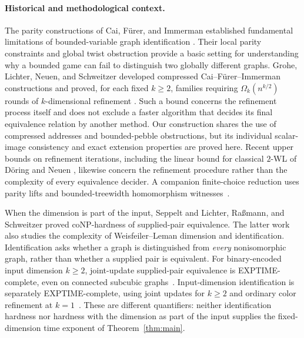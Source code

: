 \documentclass[11pt]{article}
\theoremstyle{definition}
\theoremstyle{remark}
\numberwithin{equation}{section}
\begin{document}
\paragraph{Historical and methodological context.}
The parity constructions of Cai, F\"urer, and Immerman established
fundamental limitations of bounded-variable graph identification
\cite{CFI1992}. Their local parity constraints and global twist obstruction
provide a basic setting for understanding why a bounded game can fail to
distinguish two globally different graphs.
Grohe, Lichter, Neuen, and Schweitzer developed compressed
Cai--F\"urer--Immerman constructions and proved, for each fixed $k\ge2$,
families requiring $\Omega_k(n^{k/2})$ rounds of $k$-dimensional
refinement \cite[Theorem~33 and Corollary~34]{CFICompression}.
Such a bound concerns the refinement process itself and does not exclude
a faster algorithm that decides its final equivalence relation by another
method. Our construction shares the use of compressed addresses and
bounded-pebble obstructions, but its individual scalar-image consistency
and exact extension properties are proved here.
Recent upper bounds on refinement iterations, including the linear bound
for classical $2$-WL of D\"oring and Neuen
\cite[Main Theorem~1]{DoeringNeuen2026}, likewise concern the refinement
procedure rather than the complexity of every equivalence decider.
A companion finite-choice reduction uses parity lifts and bounded-treewidth
homomorphism witnesses~\cite[Theorem~1.2 and Sections~2--4]{ParityLiftsWL2026}.

When the dimension is part of the input, Seppelt
\cite[Theorem~5]{Seppelt2024} and Lichter, Ra\ss mann, and Schweitzer
\cite[arXiv v2, Theorem~34]{WLDimension} proved coNP-hardness
of supplied-pair equivalence. The latter work also studies the complexity
of Weisfeiler--Leman dimension and identification.
Identification asks whether a graph is distinguished from \emph{every}
nonisomorphic graph, rather than whether a supplied pair is equivalent.
For binary-encoded input dimension $k\ge2$, joint-update supplied-pair
equivalence is EXPTIME-complete, even on connected subcubic
graphs~\cite[Theorem~1.1]{VariableDimensionWL2026}.
Input-dimension identification is separately EXPTIME-complete, using
joint updates for $k\ge2$ and ordinary color refinement at
$k=1$~\cite[Theorem~1.1]{WLIdentification2026}.
These are different quantifiers: neither identification hardness nor
hardness with the dimension as part of the input supplies the fixed-dimension time exponent of
Theorem~\ref{thm:main}.
\end{document}

